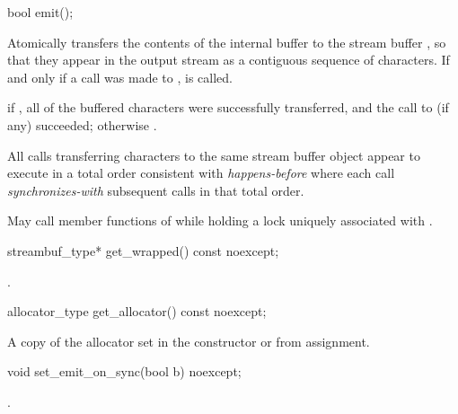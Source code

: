 \documentclass[ebook,11pt,article]{memoir}
\begin{document}

\begin{addedblock}
\begin{itemdecl}
bool emit();
\end{itemdecl}

\begin{itemdescr}
\pnum
\effects 
Atomically transfers the contents of the internal buffer to the stream buffer , so that they appear in the output stream as a contiguous sequence of characters. If and only if a call was made to ,   is called.

\pnum
\returns {} if , all of the buffered characters were successfully transferred, and the call to  (if any) succeeded; otherwise .


\pnum
{}
All  calls transferring characters to the same stream buffer object appear to execute in a total order consistent with \emph{happens-before} where each  call \emph{synchronizes-with} subsequent  calls in that total order.


\pnum
\remarks
May call member functions of  while holding a lock uniquely associated with .
\end{itemdescr}

\begin{itemdecl}
streambuf_type* get_wrapped() const noexcept;
\end{itemdecl}

\begin{itemdescr}
\pnum
\returns 
{}.
\end{itemdescr}

\begin{itemdecl}
allocator_type get_allocator() const noexcept;
\end{itemdecl}

\begin{itemdescr}
\pnum
\returns 
A copy of the allocator set in the constructor or from assignment.
\end{itemdescr}

\begin{itemdecl}
void set_emit_on_sync(bool b) noexcept;
\end{itemdecl}

\begin{itemdescr}
\pnum
\effects 
{}.
\end{itemdescr}

\end{addedblock}
\end{document}
